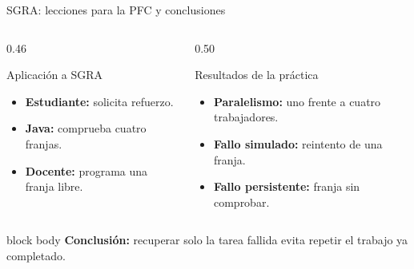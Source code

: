 \renewcommand{\fuentespie}{Fuentes: \cite{assiri2025,mushtaq2024}; práctica propia}
\begin{frame}[t]{SGRA: lecciones para la PFC y conclusiones}
  \begin{columns}[T,onlytextwidth]
    \begin{column}{0.46\textwidth}
      \begin{block}{Aplicación a SGRA}
        \small
        \begin{itemize}
          \item \textbf{Estudiante:} solicita refuerzo.
          \item \textbf{Java:} comprueba cuatro franjas.
          \item \textbf{Docente:} programa una franja libre.
        \end{itemize}
      \end{block}
    \end{column}

    \begin{column}{0.50\textwidth}
      \begin{block}{Resultados de la práctica}
        \small
        \begin{itemize}
          \item \textbf{Paralelismo:} uno frente a cuatro trabajadores.
          \item \textbf{Fallo simulado:} reintento de una franja.
          \item \textbf{Fallo persistente:} franja sin comprobar.
        \end{itemize}
      \end{block}
    \end{column}
  \end{columns}
  \vspace{1em}
  \begin{beamercolorbox}[wd=\textwidth,sep=0.8em]{block body}
    \small\textbf{Conclusión:} recuperar solo la tarea fallida evita repetir el trabajo ya completado.~\cite{assiri2025,mushtaq2024}
  \end{beamercolorbox}
\end{frame}
\renewcommand{\fuentespie}{Fuentes: [PENDIENTE]}

